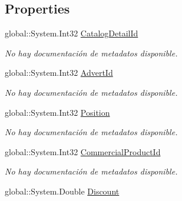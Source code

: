 \subsection*{Properties}
\begin{DoxyCompactItemize}
\item 
global\-::\-System.\-Int32 \hyperlink{class_microsoft_1_1_samples_1_1_kinect_1_1_basic_interactions_1_1_catalog_details_a860c9e80c21c3cac37b98fa531ca954e}{Catalog\-Detail\-Id}
\begin{DoxyCompactList}\small\item\em No hay documentación de metadatos disponible. \end{DoxyCompactList}\item 
global\-::\-System.\-Int32 \hyperlink{class_microsoft_1_1_samples_1_1_kinect_1_1_basic_interactions_1_1_catalog_details_a21350e755e20fa49e195548f6fb6ff06}{Advert\-Id}
\begin{DoxyCompactList}\small\item\em No hay documentación de metadatos disponible. \end{DoxyCompactList}\item 
global\-::\-System.\-Int32 \hyperlink{class_microsoft_1_1_samples_1_1_kinect_1_1_basic_interactions_1_1_catalog_details_a97d1b82a27adf8e617528e43d2b24eae}{Position}
\begin{DoxyCompactList}\small\item\em No hay documentación de metadatos disponible. \end{DoxyCompactList}\item 
global\-::\-System.\-Int32 \hyperlink{class_microsoft_1_1_samples_1_1_kinect_1_1_basic_interactions_1_1_catalog_details_a99477e9ded6ee2e528ba3381c76c9c11}{Commercial\-Product\-Id}
\begin{DoxyCompactList}\small\item\em No hay documentación de metadatos disponible. \end{DoxyCompactList}\item 
global\-::\-System.\-Double \hyperlink{class_microsoft_1_1_samples_1_1_kinect_1_1_basic_interactions_1_1_catalog_details_a5936329a5955b2d22eee48f9f7bfea39}{Discount}

\end{DoxyCompactItemize}
